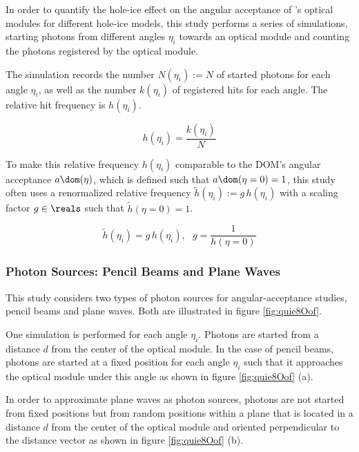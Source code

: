 In order to quantify the hole-ice effect on the angular acceptance of \icecube's optical modules for different hole-ice models, this study performs a series of simulations, starting photons from different angles $\eta_i$ towards an optical module and counting the photons registered by the optical module.

The simulation records the number $N(\eta_i):= N$ of started photons for each angle $\eta_i$, as well as the number $k(\eta_i)$ of registered hits for each angle. The relative hit frequency is $h(\eta_i)$.

\begin{equation}
  h(\eta_i) = \frac{k(\eta_i)}{N}
\end{equation}

To make this relative frequency $h(\eta_i)$ comparable to the DOM's angular acceptance $a\dom(\eta)$, which is defined such that $a\dom(\eta = 0) = 1$, this study often uses a renormalized relative frequency $\tilde{h}(\eta_i):=g\,h(\eta_i)$ with a scaling factor $g\in\reals$ such that $\tilde{h}(\eta = 0) = 1$.

\begin{equation}
  \tilde{h}(\eta_i) = g\,h(\eta_i), \ \ \
  g = \frac{1}{h(\eta = 0)}
  \label{eq:gauging_factor}
\end{equation}



\subsubsection{Photon Sources: Pencil Beams and Plane Waves}
This study considers two types of photon sources for angular-acceptance studies, pencil beams and plane waves. Both are illustrated in figure \ref{fig:quie8Oof}.

One simulation is performed for each angle $\eta_i$. Photons are started from a distance $d$ from the center of the optical module. In the case of pencil beams, photons are started at a fixed position for each angle $\eta_i$ such that it approaches the optical module under this angle as shown in figure \ref{fig:quie8Oof} (a).

In order to approximate plane waves as photon sources, photons are not started from fixed positions but from random positions within a plane that is located in a distance $d$ from the center of the optical module and oriented perpendicular to the distance vector as shown in figure \ref{fig:quie8Oof} (b).

